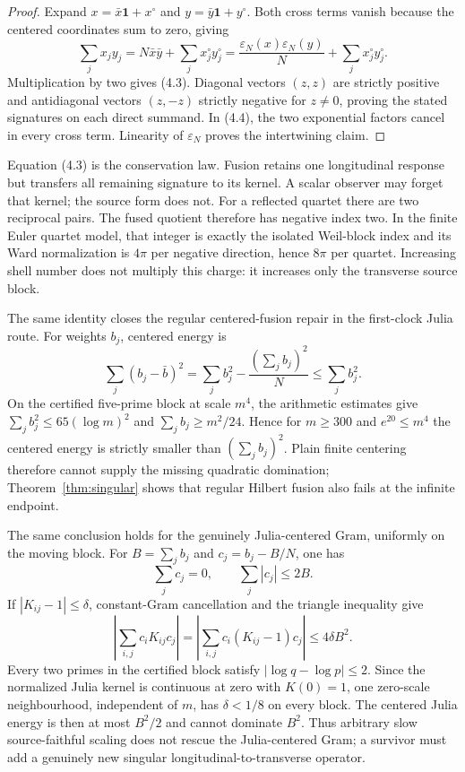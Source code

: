 \documentclass[11pt]{article}
\theoremstyle{definition}
\theoremstyle{remark}
\newcommand{\eps}{\varepsilon}
\begin{document}
\begin{proof}
Expand $x=\bar x\mathbf1+x^\circ$ and $y=\bar y\mathbf1+y^\circ$.  Both cross terms vanish
because the centered coordinates sum to zero, giving
\[
 \sum_jx_jy_j=N\bar x\bar y+\sum_jx_j^\circ y_j^\circ
 =\frac{\eps_N(x)\eps_N(y)}N+\sum_jx_j^\circ y_j^\circ.
\]
Multiplication by two gives (4.3).  Diagonal vectors $(z,z)$ are strictly positive and
antidiagonal vectors $(z,-z)$ strictly negative for $z\ne0$, proving the stated signatures on
each direct summand.  In (4.4), the two exponential factors cancel in every cross term.
Linearity of $\eps_N$ proves the intertwining claim.
\end{proof}

Equation (4.3) is the conservation law.  Fusion retains one longitudinal response but transfers
all remaining signature to its kernel.  A scalar observer may forget that kernel; the source form
does not.  For a reflected quartet there are two reciprocal pairs.  The fused quotient therefore
has negative index two.  In the finite Euler quartet model, that integer is exactly the isolated
Weil-block index and its Ward normalization is $4\pi$ per negative direction, hence $8\pi$ per
quartet.  Increasing shell number does not multiply this charge: it increases only the
transverse source block.

The same identity closes the regular centered-fusion repair in the first-clock Julia route.
For weights $b_j$, centered energy is
\[
 \sum_j(b_j-\bar b)^2=\sum_jb_j^2-\frac{(\sum_jb_j)^2}{N}
 \leq\sum_jb_j^2.
\]
On the certified five-prime block at scale $m^4$, the arithmetic estimates give
$\sum_jb_j^2\leq65(\log m)^2$ and $\sum_jb_j\geq m^2/24$.  Hence for
$m\geq300$ and $e^{20}\leq m^4$ the centered energy is strictly smaller than
$(\sum_jb_j)^2$.  Plain finite centering therefore cannot supply the missing quadratic
domination; Theorem~\ref{thm:singular} shows that regular Hilbert fusion also fails at the
infinite endpoint.

The same conclusion holds for the genuinely Julia-centered Gram, uniformly on the moving block.
For $B=\sum_jb_j$ and $c_j=b_j-B/N$, one has
\[
 \sum_jc_j=0,\qquad \sum_j|c_j|\leq2B.
\]
If $|K_{ij}-1|\leq\delta$, constant-Gram cancellation and the triangle inequality give
\[
 \left|\sum_{i,j}c_iK_{ij}c_j\right|
 =\left|\sum_{i,j}c_i(K_{ij}-1)c_j\right|
 \leq4\delta B^2.
\]
Every two primes in the certified block satisfy $|\log q-\log p|\leq2$.  Since the normalized
Julia kernel is continuous at zero with $K(0)=1$, one zero-scale neighbourhood, independent of
$m$, has $\delta<1/8$ on every block.  The centered Julia energy is then at most $B^2/2$ and
cannot dominate $B^2$.  Thus arbitrary slow source-faithful scaling does not rescue the
Julia-centered Gram; a survivor must add a genuinely new singular longitudinal-to-transverse
operator.
\end{document}
